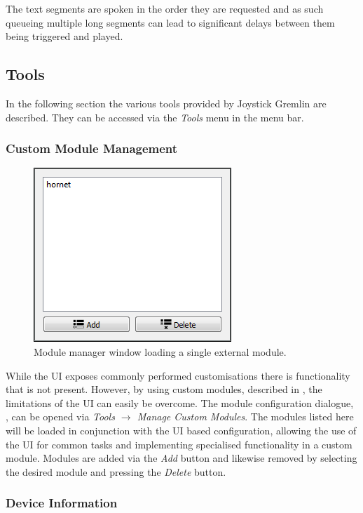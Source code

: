 \documentclass[a4, 10pt]{article}
\newcommand{\JG}{Joystick Gremlin}
\begin{document}
The text segments are spoken in the order they are requested and as such
queueing multiple long segments can lead to significant delays between
them being triggered and played.

\FloatBarrier


\subsection{Tools}

In the following section the various tools provided by \JG{} are
described. They can be accessed via the \emph{Tools} menu in the menu
bar.

\subsubsection{Custom Module Management}

\begin{figure}[bt]
    \centering

    \includegraphics[width=0.3\linewidth]{images/module_manager}
    \caption{Module manager window loading a single external module.}
    \label{fig:custom_module}
\end{figure}

While the UI exposes commonly performed customisations there is
functionality that is not present. However, by using custom modules,
described in , the limitations of the UI can
easily be overcome. The module configuration dialogue,
, can be opened via \emph{Tools $\rightarrow$
Manage Custom Modules}. The modules listed here will be loaded in
conjunction with the UI based configuration, allowing the use of the UI
for common tasks and implementing specialised functionality in a custom
module. Modules are added via the \emph{Add} button and likewise removed
by selecting the desired module and pressing the \emph{Delete} button.


\subsubsection{Device Information}
\end{document}
